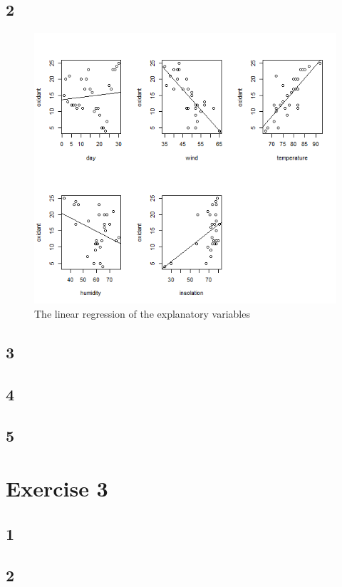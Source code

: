 \documentclass{article}
\begin{document}
    \subsection*{2}
      \begin{figure}[H]
          \centering
          \includegraphics[scale=0.6]{../results/2_2.png}
          \caption{The linear regression of the explanatory variables}
          \label{fig:BoxHours}
      \end{figure} 
    \subsection*{3}
    \subsection*{4}
    \subsection*{5}

  \section*{Exercise 3}
    \subsection*{1}
    \subsection*{2}
\end{document}
